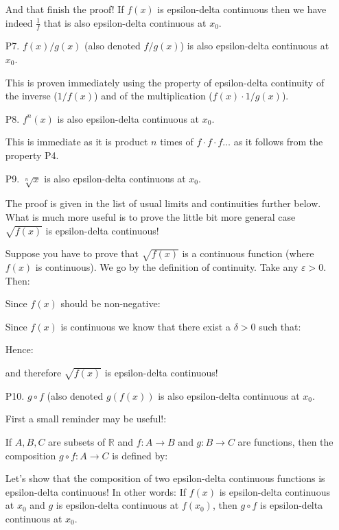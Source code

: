 \begin{enumerate}
		And that finish the proof! If $f(x)$ is epsilon-delta continuous then we have indeed $\frac{1}{f}$ that is also epsilon-delta continuous at $x_0$.
		
		\item[P7.] $f(x)/g(x)$ (also denoted $f/g(x)$) is also epsilon-delta continuous at $x_0$.
		
		This is proven immediately using the property of epsilon-delta continuity of the inverse ($1/f(x)$) and of the multiplication  ($f(x)\cdot 1/g(x)$).
		
		\item[P8.] $f^n(x)$ is also epsilon-delta continuous at $x_0$.
		
		This is immediate as it is product $n$ times of $f\cdot f\cdot f\ldots$ as it follows from the property P4.
		
		\item[P9.] $\sqrt[n]{x}$ is also epsilon-delta continuous at $x_0$.
		
		The proof is given in the list of usual limits and continuities further below. What is much more useful is to prove the little bit more general case $\sqrt{f(x)}$ is epsilon-delta continuous!
		
		Suppose you have to prove that $\sqrt{f(x)}$ is a continuous function (where $f(x)$ is continuous). We go by the definition of continuity. Take any $\varepsilon>0$. Then:
		
		Since $f(x)$ should be non-negative:
		
		Since $f(x)$ is continuous we know that there exist a $\delta>0$ such that:
		
		Hence:
		
		and therefore $\sqrt{f(x)}$ is epsilon-delta continuous!
		
		\item[P10.] $g\circ f$ (also denoted $g(f(x))$ is also epsilon-delta continuous at $x_0$.
		
		First a small reminder may be useful!:
		
		If $A, B, C$ are subsets of $\mathbb{R}$ and $f: A \rightarrow B$ and $g: B \rightarrow C$ are functions, then the composition $g \circ f: A \rightarrow C$ is defined by:
		
		Let's show that the composition of two epsilon-delta continuous functions is epsilon-delta continuous! In other words: If $f(x)$ is epsilon-delta continuous at $x_0$ and $g$ is epsilon-delta continuous at $f\left(x_0\right)$, then $g \circ f$ is epsilon-delta continuous at $x_0$.
	

\end{enumerate}
